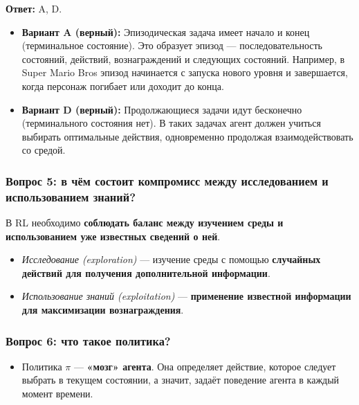 \documentclass[11pt,a4paper]{article}
\begin{document}
\textbf{Ответ:} A, D.

\begin{itemize}
\item
  \textbf{Вариант A (верный):} Эпизодическая задача имеет начало и конец (терминальное состояние). Это образует эпизод --- последовательность состояний, действий, вознаграждений и следующих состояний. Например, в Super Mario Bros эпизод начинается с запуска нового уровня и завершается, когда персонаж погибает или доходит до конца.
\item
  \textbf{Вариант D (верный):} Продолжающиеся задачи идут бесконечно (терминального состояния нет). В таких задачах агент должен учиться выбирать оптимальные действия, одновременно продолжая взаимодействовать со средой.
\end{itemize}

\subsubsection{Вопрос 5: в чём состоит компромисс между исследованием и использованием знаний?}\label{q5-what-is-the-explorationexploitation-tradeoff-1}

В RL необходимо \textbf{соблюдать баланс между изучением среды и использованием уже известных сведений о ней}.

\begin{itemize}
\item
  \emph{Исследование (exploration)} --- изучение среды с помощью \textbf{случайных действий для получения дополнительной информации}.
\item
  \emph{Использование знаний (exploitation)} --- \textbf{применение известной информации для максимизации вознаграждения}.
\end{itemize}


\subsubsection{Вопрос 6: что такое политика?}\label{q6-what-is-a-policy-1}

\begin{itemize}
\tightlist
\item
  Политика $\pi$ --- \textbf{«мозг» агента}. Она определяет действие, которое следует выбрать в текущем состоянии, а значит, задаёт поведение агента в каждый момент времени.
\end{itemize}
\end{document}
